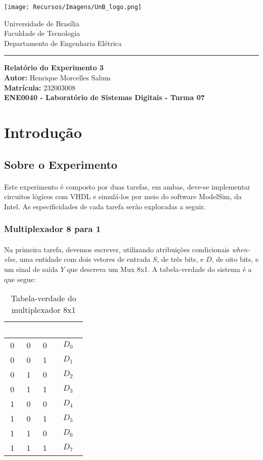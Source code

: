 \documentclass[a4paper,12pt]{article}
\newcommand{\capa}{
    \begin{titlepage}
        \begin{multicols}{2}
            \begin{flushleft}
                \texttt{[image: Recursos/Imagens/UnB\_logo.png]}
            \end{flushleft}
            \columnbreak
            \begin{flushright}
                Universidade de Brasília \\
                Faculdade de Tecnologia \\
                Departamento de Engenharia Elétrica
            \end{flushright}
        \end{multicols}
        \begin{center}
        \vspace{-20pt}
        \rule{\textwidth}{0.4pt}
        \end{center}
        \vspace{0.6cm}
        \begin{center}
            {\Huge \textbf{Relatório do Experimento 3}} \\[1em]
            {\large \textbf{Autor:} Henrique Morcelles Salum} \\[0.5em]
            {\large \textbf{Matrícula:} 232003008} \\
            \vfill
            {\large \textbf{ENE0040 - Laboratório de Sistemas Digitais - Turma 07}} \\
        \end{center}
    \end{titlepage}
}
\begin{document}
\capa

\newpage
\tableofcontents
\newpage

\section{Introdução}

\subsection{Sobre o Experimento}
\paragraph{}
Este experimento é composto por duas tarefas, em ambas, deve-se implementar circuitos lógicos com VHDL e simulá-los por meio do software ModelSim, da Intel. As especificidades de cada tarefa serão exploradas a seguir.

\subsubsection{Multiplexador 8 para 1}
\paragraph{}
Na primeira tarefa, devemos escrever, utilizando atribuições condicionais \textit{when-else}, uma entidade com dois vetores de entrada $S$, de três bits, e $D$, de oito bits, e um sinal de saída $Y$ que descreva um Mux 8x1. A tabela-verdade do sistema é a que segue:

\begin{table}[H]
    \footnotesize
    \centering
    \begin{tabular}{|c|c|c|c|}
        \hline
        \rowcolor{black}
        \textcolor{white}{$S_2$} & \textcolor{white}{$S_1$} & \textcolor{white}{$S_0$} & \textcolor{white}{Saída} \\ \hline
        0 & 0 & 0 & $D_0$ \\ \hline
        \rowcolor{cinza}
        0 & 0 & 1 & $D_1$ \\ \hline
        0 & 1 & 0 & $D_2$ \\ \hline
        \rowcolor{cinza}
        0 & 1 & 1 & $D_3$ \\ \hline
        1 & 0 & 0 & $D_4$ \\ \hline
        \rowcolor{cinza}
        1 & 0 & 1 & $D_5$ \\ \hline
        1 & 1 & 0 & $D_6$ \\ \hline
        \rowcolor{cinza}
        1 & 1 & 1 & $D_7$ \\ \hline
    \end{tabular}
    \caption{Tabela-verdade do multiplexador 8x1}
    \vspace{-5pt}
\end{table}
\end{document}
